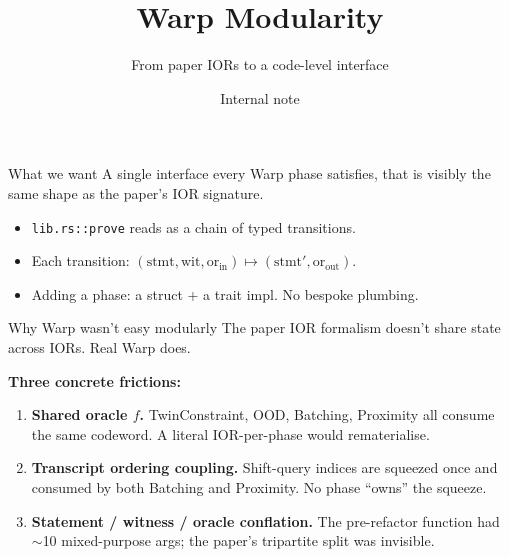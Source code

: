 \documentclass[10pt,aspectratio=169]{beamer}
\title{Warp Modularity}
\subtitle{From paper IORs to a code-level interface}
\author{Internal note}
\date{}
\begin{document}
\maketitle

\begin{frame}{What we want}
A single interface every Warp phase satisfies, that is visibly the same
shape as the paper's IOR signature.

\vspace{0.5em}
\begin{itemize}
  \item \texttt{lib.rs::prove} reads as a chain of typed transitions.
  \item Each transition: $(\text{stmt}, \text{wit}, \text{or}_\text{in}) \mapsto (\text{stmt}', \text{or}_\text{out})$.
  \item Adding a phase: a struct + a trait impl. No bespoke plumbing.
\end{itemize}

\end{frame}

\begin{frame}{Why Warp wasn't easy modularly}
The paper IOR formalism doesn't share state across IORs. Real Warp does.

\vspace{0.4em}
\textbf{Three concrete frictions:}
\begin{enumerate}
  \item \textbf{Shared oracle $f$.} TwinConstraint, OOD, Batching, Proximity all consume the same codeword. A literal IOR-per-phase would rematerialise.
  \item \textbf{Transcript ordering coupling.} Shift-query indices are squeezed once and consumed by both Batching and Proximity. No phase ``owns'' the squeeze.
  \item \textbf{Statement / witness / oracle conflation.} The pre-refactor function had $\sim$10 mixed-purpose args; the paper's tripartite split was invisible.
\end{enumerate}
\end{frame}
\end{document}
